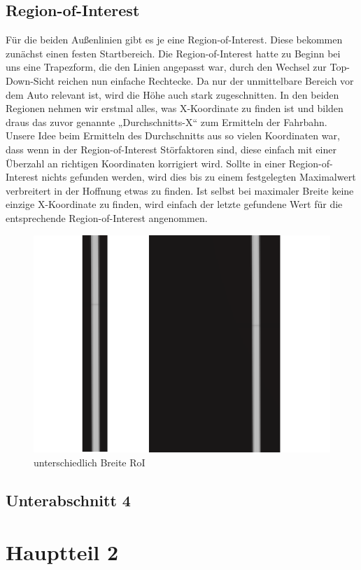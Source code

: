 \subsection{Region-of-Interest}
Für die beiden Außenlinien gibt es je eine Region-of-Interest. Diese bekommen zunächst einen festen Startbereich. Die Region-of-Interest hatte zu Beginn bei uns eine Trapezform, die den  Linien angepasst war, durch den Wechsel zur Top-Down-Sicht reichen nun einfache Rechtecke. Da nur der unmittelbare Bereich vor dem Auto relevant ist, wird die Höhe auch stark zugeschnitten. In den beiden Regionen nehmen wir erstmal alles, was X-Koordinate zu finden ist und bilden draus das zuvor genannte „Durchschnitts-X“ zum Ermitteln der Fahrbahn. Unsere Idee beim Ermitteln des Durchschnitts aus so vielen Koordinaten war, dass wenn in der Region-of-Interest Störfaktoren sind, diese einfach mit einer Überzahl an richtigen Koordinaten korrigiert wird. Sollte in einer Region-of-Interest nichts gefunden werden, wird dies bis zu einem festgelegten Maximalwert verbreitert in der Hoffnung etwas zu finden. Ist selbst bei maximaler Breite keine einzige X-Koordinate zu finden, wird einfach der letzte gefundene Wert für die entsprechende Region-of-Interest angenommen.

\begin{figure}[H]
	\centering	
	\includegraphics[width=.5\textwidth]{img/roi_breite}
	\caption[unterschiedlich Breite RoI]{unterschiedlich Breite RoI}
	\label{fig:vector_kurve}
\end{figure}

\subsection{Unterabschnitt 4}
\Blindtext\Blindtext

\section{Hauptteil 2}

